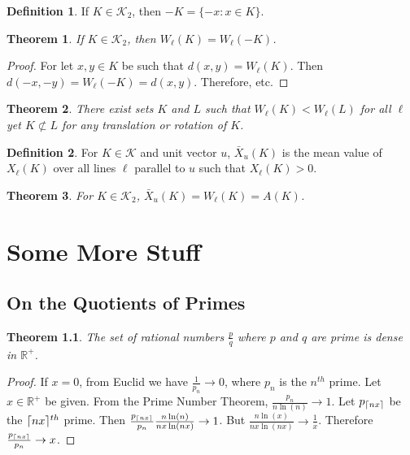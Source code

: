 \documentclass[oneside]{book}
\newtheorem{theorem}{Theorem}[section]
\theoremstyle{definition}
\newtheorem{definition}{Definition}[section]
\DeclarePairedDelimiter\ceil{\lceil}{\rceil}
\begin{document}
\begin{definition}
If $K\in \mathscr{K}_2$, then $-K = \{-x:x\in K\}$.
\end{definition}

\begin{theorem}
If $K\in \mathscr{K}_2$, then $W_{\ell}(K) = W_{\ell}(-K)$.
\end{theorem}
\begin{proof}
For let $x,y\in K$ be such that $d(x,y) = W_{\ell}(K)$. Then $d(-x,-y) = W_{\ell}(-K) = d(x,y)$. Therefore, etc.
\end{proof}

\begin{theorem}
There exist sets $K$ and $L$ such that $W_{\ell}(K)<W_{\ell}(L)$ for all $\ell$ yet $K\not\subset L$ for any translation or rotation of $K$.
\end{theorem}

\begin{definition}
For $K\in \mathscr{K}$ and unit vector $u$, $\bar{X}_{u}(K)$ is the mean value of $X_{\ell}(K)$ over all lines $\ell$ parallel to $u$ such that $X_{\ell}(K)>0$.
\end{definition}

\begin{theorem}
For $K\in \mathscr{K}_2$, $\bar{X}_{u}(K) = W_{\ell}(K)=A(K)$.
\end{theorem}


\chapter{Some More Stuff}

\section{On the Quotients of Primes}
\begin{theorem}
The set of rational numbers $\frac{p}{q}$ where $p$ and $q$ are prime is dense in $\mathbb{R}^{+}$.
\end{theorem}
\begin{proof}
If $x=0$, from Euclid we have $\frac{1}{p_n}\rightarrow 0$, where $p_n$ is the $n^{th}$ prime. Let $x\in\mathbb{R}^{+}$ be given. From the Prime Number Theorem, $\frac{p_n}{n\ln(n)}\rightarrow 1$. Let $p_{\ceil{nx}}$ be the $\ceil{nx}^{th}$ prime. Then $\frac{p_{\ceil{nx}}}{p_n}\frac{n\ln(n)}{nx\ln(nx)}\rightarrow 1$. But $\frac{n\ln(x)}{nx\ln(nx)}\rightarrow \frac{1}{x}$. Therefore $\frac{p_{\ceil{nx}}}{p_n}\rightarrow x$.
\end{proof}
\end{document}
